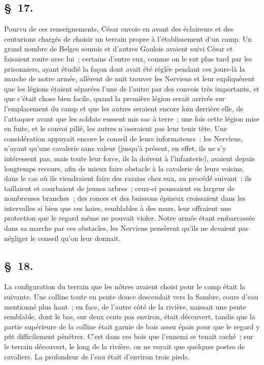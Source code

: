 \documentclass[french,twoside]{book} %
\begin{document}
\subsection[{§ 17.}]{ \textsc{§ 17.} }
\noindent Pourvu de ces renseignements, César envoie en avant des éclaireurs et des centurions chargés de choisir un terrain propre à l’établissement d’un camp. Un grand nombre de Belges soumis et d’autres Gaulois avaient suivi César et faisaient route avec lui ; certains d’entre eux, comme on le sut plus tard par les prisonniers, ayant étudié la façon dont avait été réglée pendant ces jours-là la marche de notre armée, allèrent de nuit trouver les Nerviens et leur expliquèrent que les légions étaient séparées l’une de l’autre par des convois très importants, et que c’était chose bien facile, quand la première légion serait arrivée sur l’emplacement du camp et que les autres seraient encore loin derrière elle, de l’attaquer avant que les soldats eussent mis sac à terre ; une fois cette légion mise en fuite, et le convoi pillé, les autres n’oseraient pas leur tenir tête. Une considération appuyait encore le conseil de leurs informateurs : les Nerviens, n’ayant qu’une cavalerie sans valeur (jusqu’à présent, en effet, ils ne s’y intéressent pas, mais toute leur force, ils la doivent à l’infanterie), avaient depuis longtemps recours, afin de mieux faire obstacle à la cavalerie de leurs voisins, dans le cas où ils viendraient faire des razzias chez eux, au procédé suivant : ils taillaient et courbaient de jeunes arbres ; ceux-ci poussaient en largeur de nombreuses branches ; des ronces et des buissons épineux croissaient dans les intervalles si bien que ces haies, semblables à des murs, leur offraient une protection que le regard même ne pouvait violer. Notre armée étant embarrassée dans sa marche par ces obstacles, les Nerviens pensèrent qu’ils ne devaient pas négliger le conseil qu’on leur donnait.
\subsection[{§ 18.}]{ \textsc{§ 18.} }
\noindent La configuration du terrain que les nôtres avaient choisi pour le camp était la suivante. Une colline toute en pente douce descendait vers la Sambre, cours d’eau mentionné plus haut ; en face, de l’autre côté de la rivière, naissait une pente semblable, dont le bas, sur deux cents pas environ, était découvert, tandis que la partie supérieure de la colline était garnie de bois assez épais pour que le regard y pût difficilement pénétrer. C'est dans ces bois que l’ennemi se tenait caché ; sur le terrain découvert, le long de la rivière, on ne voyait que quelques postes de cavaliers. La profondeur de l’eau était d’environ trois pieds.
\end{document}
